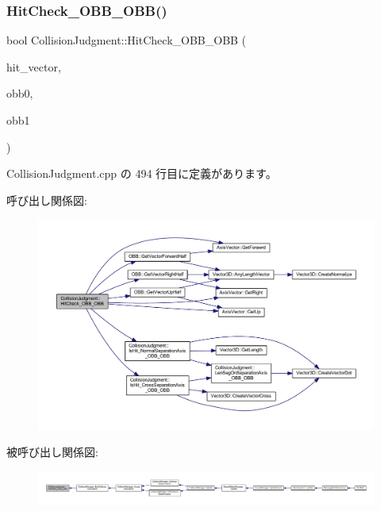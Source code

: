 \subsubsection{\texorpdfstring{Hit\+Check\+\_\+\+O\+B\+B\+\_\+\+O\+B\+B()}{HitCheck\_OBB\_OBB()}}
{\footnotesize\ttfamily bool Collision\+Judgment\+::\+Hit\+Check\+\_\+\+O\+B\+B\+\_\+\+O\+BB (\begin{DoxyParamCaption}\item[{\mbox{\hyperlink{class_vector3_d}{Vector3D}} $\ast$}]{hit\+\_\+vector,  }\item[{\mbox{\hyperlink{class_o_b_b}{O\+BB}} $\ast$}]{obb0,  }\item[{\mbox{\hyperlink{class_o_b_b}{O\+BB}} $\ast$}]{obb1 }\end{DoxyParamCaption})\hspace{0.3cm}{\ttfamily [static]}}



 Collision\+Judgment.\+cpp の 494 行目に定義があります。

呼び出し関係図\+:\nopagebreak
\begin{figure}[H]
\begin{center}
\leavevmode
\includegraphics[width=350pt]{class_collision_judgment_a3c0a99feef4531370096d458aefa8941_cgraph}
\end{center}
\end{figure}
被呼び出し関係図\+:
\nopagebreak
\begin{figure}[H]
\begin{center}
\leavevmode
\includegraphics[width=350pt]{class_collision_judgment_a3c0a99feef4531370096d458aefa8941_icgraph}
\end{center}
\end{figure}
\mbox{\label{class_collision_judgment_a01ad684bee6964d4315df1a23ac3ec7d}} 
